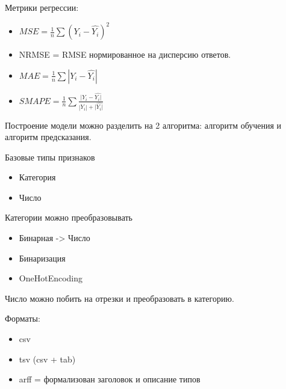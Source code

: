 Метрики регрессии:
\begin{itemize}
    \item $MSE = \frac{1}n \sum (Y_i - \hat{Y_i})^2$
    \item NRMSE = RMSE нормированное на дисперсию ответов.
    \item $MAE = \frac{1}n \sum |Y_i - \hat{Y_i}|$
    \item $SMAPE = \frac{1}{n} \sum \frac{|Y_i - \hat{Y_i|}}{|Y_i| + |\hat{Y_i|}}$
\end{itemize}

Построение модели можно разделить на 2 алгоритма: алгоритм обучения и
алгоритм предсказания.


Базовые типы признаков
\begin{itemize}
    \item Категория
    \item Число
\end{itemize}

Категории можно преобразовывать
\begin{itemize}
    \item Бинарная -> Число
    \item Бинаризация
    \item OneHotEncoding
\end{itemize}

Число можно побить на отрезки и преобразовать в категорию.

Форматы:
\begin{itemize}
    \item csv
    \item tsv (csv + tab)
    \item arff = формализован заголовок и описание типов
\end{itemize}




